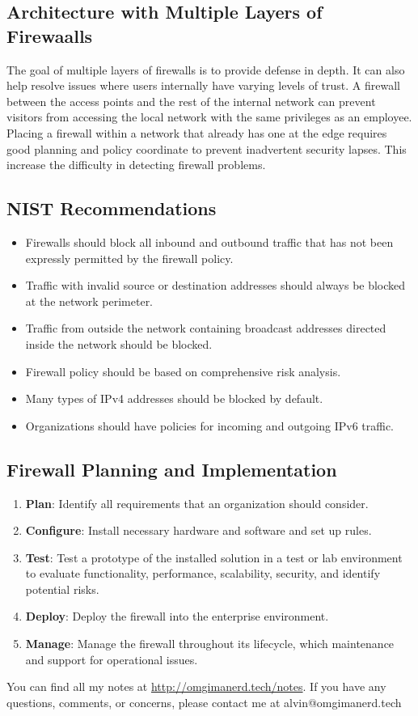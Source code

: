 \documentclass{math}
\begin{document}
\subsection*{Architecture with Multiple Layers of Firewaalls}
The goal of multiple layers of firewalls is to provide defense in depth. It can
also help resolve issues where users internally have varying levels of trust. A
firewall between the access points and the rest of the internal network can
prevent visitors from accessing the local network with the same privileges as
an employee. Placing a firewall within a network that already has one at the
edge requires good planning and policy coordinate to prevent inadvertent
security lapses. This increase the difficulty in detecting firewall problems.

\subsection*{NIST Recommendations}
\begin{itemize}
  \item Firewalls should block all inbound and outbound traffic that has not
    been expressly permitted by the firewall policy.
  \item Traffic with invalid source or destination addresses should always be
    blocked at the network perimeter.
  \item Traffic from outside the network containing broadcast addresses
    directed inside the network should be blocked.
  \item Firewall policy should be based on comprehensive risk analysis.
  \item Many types of IPv4 addresses should be blocked by default.
  \item Organizations should have policies for incoming and outgoing IPv6
    traffic.
\end{itemize}

\subsection*{Firewall Planning and Implementation}
\begin{enumerate}
  \item \textbf{Plan}: Identify all requirements that an organization should
    consider.
  \item \textbf{Configure}: Install necessary hardware and software and set up
    rules.
  \item \textbf{Test}: Test a prototype of the installed solution in a test or
    lab environment to evaluate functionality, performance, scalability,
    security, and identify potential risks.
  \item \textbf{Deploy}: Deploy the firewall into the enterprise environment.
  \item \textbf{Manage}: Manage the firewall throughout its lifecycle, which
    maintenance and support for operational issues.
\end{enumerate}

\begin{center}
  You can find all my notes at \url{http://omgimanerd.tech/notes}. If you have
  any questions, comments, or concerns, please contact me at
  alvin@omgimanerd.tech
\end{center}
\end{document}
